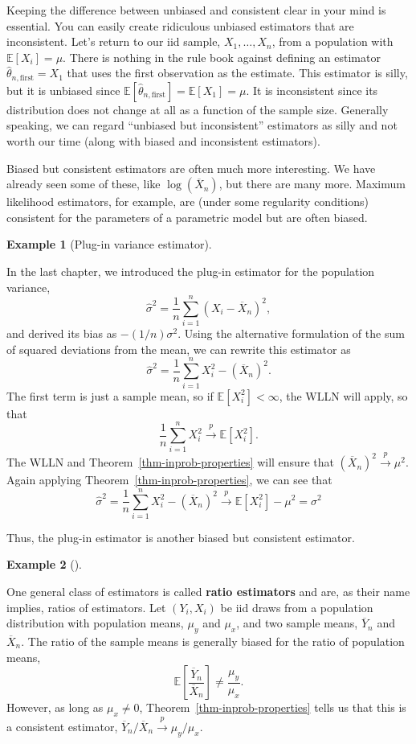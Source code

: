 \documentclass[
  13pt,
  letterpaper,
  DIV=11,
  numbers=noendperiod]{scrreprt}
\newcommand{\E}{\mathbb{E}}
\newcommand{\Xbar}{\overline{X}}
\newcommand{\Ybar}{\overline{Y}}
\newcommand{\inprob}{\overset{p}{\to}}
\theoremstyle{plain}
\theoremstyle{plain}
\theoremstyle{definition}
\theoremstyle{definition}
\newtheorem{example}{Example}[chapter]
\theoremstyle{remark}
\begin{document}
Keeping the difference between unbiased and consistent clear in your
mind is essential. You can easily create ridiculous unbiased estimators
that are inconsistent. Let's return to our iid sample,
\(X_1, \ldots, X_n\), from a population with \(\E[X_i] = \mu\). There is
nothing in the rule book against defining an estimator
\(\widehat{\theta}_{n,\text{first}} = X_1\) that uses the first
observation as the estimate. This estimator is silly, but it is unbiased
since \(\E[\widehat{\theta}_{n,\text{first}}] = \E[X_1] = \mu\). It is
inconsistent since its distribution does not change at all as a function
of the sample size. Generally speaking, we can regard ``unbiased but
inconsistent'' estimators as silly and not worth our time (along with
biased and inconsistent estimators).

Biased but consistent estimators are often much more interesting. We
have already seen some of these, like \(\log(\Xbar_n)\), but there are
many more. Maximum likelihood estimators, for example, are (under some
regularity conditions) consistent for the parameters of a parametric
model but are often biased.

\begin{example}[Plug-in variance
estimator]\protect\hypertarget{exm-plug-in-variance}{}\label{exm-plug-in-variance}

In the last chapter, we introduced the plug-in estimator for the
population variance, \[
\widehat{\sigma}^2 = \frac{1}{n} \sum_{i=1}^n (X_i - \Xbar_n)^2,
\] and derived its bias as \(-(1/n)\sigma^2\). Using the alternative
formulation of the sum of squared deviations from the mean, we can
rewrite this estimator as \[
\widehat{\sigma}^2 = \frac{1}{n} \sum_{i=1}^n X_i^2 - (\Xbar_n)^2.
\] The first term is just a sample mean, so if \(\E[X_i^2] < \infty\),
the WLLN will apply, so that \[
\frac{1}{n} \sum_{i=1}^n X_i^2 \inprob \E[X_i^2].
\] The WLLN and Theorem~\ref{thm-inprob-properties} will ensure that
\((\Xbar_n)^2 \inprob \mu^2\). Again applying
Theorem~\ref{thm-inprob-properties}, we can see that \[
\widehat{\sigma}^2 = \frac{1}{n} \sum_{i=1}^n X_i^2 - (\Xbar_n)^2 \inprob \E[X_i^2] - \mu^2 = \sigma^2
\]

Thus, the plug-in estimator is another biased but consistent estimator.

\end{example}

\begin{example}[]\protect\hypertarget{exm-ratio-estimator}{}\label{exm-ratio-estimator}

One general class of estimators is called \textbf{ratio estimators} and
are, as their name implies, ratios of estimators. Let \((Y_i, X_i)\) be
iid draws from a population distribution with population means,
\(\mu_y\) and \(\mu_x\), and two sample means, \(\Ybar_n\) and
\(\Xbar_n\). The ratio of the sample means is generally biased for the
ratio of population means, \[
\E\left[\frac{\Ybar_n}{\Xbar_n} \right] \neq \frac{\mu_y}{\mu_x}.
\] However, as long as \(\mu_x \neq 0\),
Theorem~\ref{thm-inprob-properties} tells us that this is a consistent
estimator, \(\Ybar_n/\Xbar_n \inprob \mu_y/\mu_x\).

\end{example}
\end{document}
